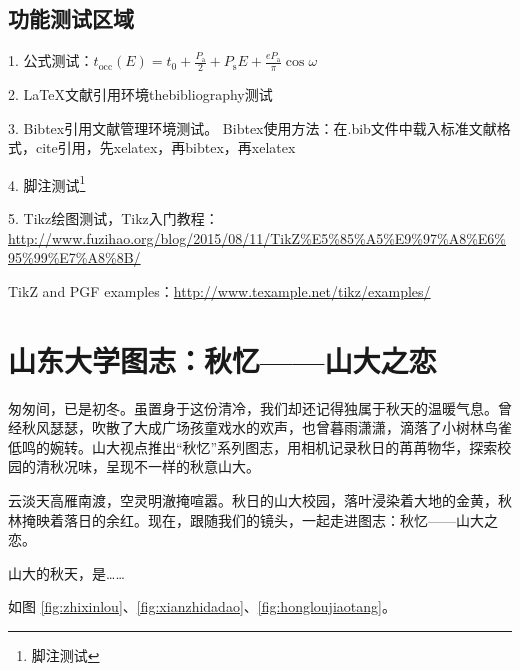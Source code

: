 \documentclass[openany]{sduthesis} %
\begin{document}
\section{功能测试区域}
1. 公式测试：$t_{\mathrm{occ}}(E)=t_{0}+\frac{P_{\mathrm{a}}}{2}+P_{\mathrm{s}} E+\frac{e P_{\mathrm{a}}}{\pi} \cos \omega$  

2. \LaTeX 文献引用环境thebibliography测试

3. Bibtex引用文献管理环境测试\cite{DBLP:journals/sac/Braak06}。
Bibtex使用方法：在.bib文件中载入标准文献格式，cite引用，先xelatex，再bibtex，再xelatex

4. 脚注测试\footnote{脚注测试}

5. Tikz绘图测试，Tikz入门教程：\url{http://www.fuzihao.org/blog/2015/08/11/TikZ%E5%85%A5%E9%97%A8%E6%95%99%E7%A8%8B/}

TikZ and PGF examples：\href{http://www.texample.net/tikz/examples/}{http://www.texample.net/tikz/examples/}


\begin{center}
\end{center}





\chapter{山东大学图志：秋忆——山大之恋}

匆匆间，已是初冬。虽置身于这份清冷，我们却还记得独属于秋天的温暖气息。曾经秋风瑟瑟，吹散了大成广场孩童戏水的欢声，也曾暮雨潇潇，滴落了小树林鸟雀低鸣的婉转。山大视点推出“秋忆”系列图志，用相机记录秋日的苒苒物华，探索校园的清秋况味，呈现不一样的秋意山大。

云淡天高雁南渡，空灵明澈掩喧嚣。秋日的山大校园，落叶浸染着大地的金黄，秋林掩映着落日的余红。现在，跟随我们的镜头，一起走进图志：秋忆——山大之恋。

山大的秋天，是……

如图 \ref{fig:zhixinlou}、\ref{fig:xianzhidadao}、\ref{fig:hongloujiaotang}。
\end{document}
